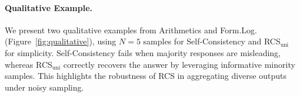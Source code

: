 \paragraph{Qualitative Example.}\label{sec:qualitative}
We present two qualitative examples from Arithmetics and Form.Log. (Figure~\ref{fig:qualitative}), using $N{=}5$ samples for Self-Consistency and RCS$_\text{uni}$ for simplicity. 
Self-Consistency fails when majority responses are misleading, whereas RCS$_\text{uni}$ correctly recovers the answer by leveraging informative minority samples. This highlights the robustness of RCS in aggregating diverse outputs under noisy sampling.






